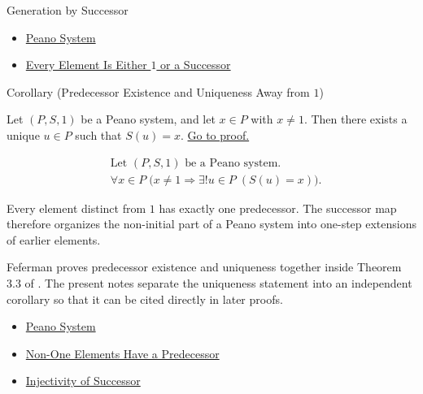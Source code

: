 \begin{topicbox}{Generation by Successor}
\begin{dependencies}
\begin{itemize}
  \item \hyperref[def:peano-system]{Peano System}
  \item \hyperref[thm:every-element-is-one-or-a-successor]{Every Element Is Either $1$ or a Successor}
\end{itemize}
\end{dependencies}

\begin{corollarybox}{Corollary (Predecessor Existence and Uniqueness Away from \texorpdfstring{$1$}{1})}
\begin{corollary}
\label{cor:predecessor-exists-unique-away-from-one}
Let $(P,S,1)$ be a Peano system, and let $x \in P$ with $x \neq 1$. Then
there exists a unique $u \in P$ such that $S(u)=x$.
\hyperref[prf:predecessor-exists-unique-away-from-one]{Go to proof.}
\end{corollary}
\end{corollarybox}

\begin{remark*}
\[
\begin{aligned}
&\text{Let } (P,S,1) \text{ be a Peano system.}\\
&\forall x \in P\;\bigl(x \neq 1 \Longrightarrow \exists! u \in P\;(S(u)=x)\bigr).
\end{aligned}
\]
\end{remark*}

\begin{remark*}[Interpretation]
Every element distinct from $1$ has exactly one predecessor. The successor map
therefore organizes the non-initial part of a Peano system into one-step
extensions of earlier elements.
\end{remark*}

\begin{remark*}
Feferman proves predecessor existence and uniqueness together inside Theorem
3.3 of \citet{FefermanNumberSystems1964}. The present notes separate the
uniqueness statement into an independent corollary so that it can be cited
directly in later proofs.
\end{remark*}

\begin{dependencies}
\begin{itemize}
  \item \hyperref[def:peano-system]{Peano System}
  \item \hyperref[cor:non-one-elements-have-a-predecessor]{Non-One Elements Have a Predecessor}
  \item \hyperref[ax:peano-successor-injective]{Injectivity of Successor}
\end{itemize}
\end{dependencies}


\end{topicbox}
